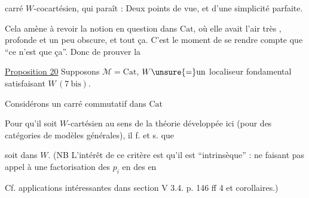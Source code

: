 
carré $W$-cocartésien, qui paraît  : Deux points de vue, et d'une simplicité parfaite.

Cela amène à revoir la notion en question dans $\mathrm{Cat}$, où elle avait l'air très , profonde et un peu obscure,  et tout ça. C'est le moment de se rendre compte que ``ce n'est que ça''. Donc de prouver la

\uline{Proposition 20} Supposons $\mathcal M=\mathrm{Cat}$, $W\unsure{=}\text{un}$ localiseur fondamental satisfaisant $W\,(7\ \mathrm{bis})$.

Considérons un carré commutatif dans $\mathrm{Cat}$


Pour qu'il soit $W$-cartésien au sens de la théorie  développée ici (pour des catégories de modèles générales), il f. et s. que


soit dans $W$. (NB L'intérêt de ce critère est qu'il est ``intrinsèque'' : ne faisant pas appel à une factorisation des $p_i$ en des  en


Cf. applications intéressantes dans section V 3.4. p. 146 ff  4 et corollaires.)
